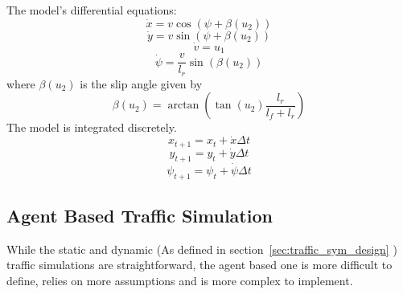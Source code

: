 \documentclass{article}
\begin{document}
\smallskip
The model's differential equations:
\begin{equation}\dot{x} = v \cos(\psi + \beta (u_2)) \end{equation}
\begin{equation}\dot{y} = v \sin(\psi + \beta (u_2)) \end{equation}
\begin{equation}\dot{v} = u_1 \end{equation}
\begin{equation}\dot{\psi} = \frac{v} {l_r} \sin(\beta(u_2)) \end{equation}
\medskip
where \( \beta(u_2) \) is the slip angle given by
\begin{equation} \beta(u_2) = \arctan (\tan(u_2) \frac{l_r} { l_f + l_r })  \end{equation}
\bigskip
The model is integrated discretely.
\begin{equation} x_{t+1} = x_t + \dot{x}\Delta t \end{equation}
\begin{equation} y_{t+1} = y_t + \dot{y}\Delta t \end{equation}
\begin{equation} {\psi}_{t+1} = {\psi}_t + \dot{\psi}\Delta t\end{equation}

\clearpage

\subsection{Agent Based Traffic Simulation}
While the static and dynamic (As defined in section~\ref{sec:traffic_sym_design} ) traffic simulations are straightforward, the agent based one is more difficult to define, relies on more assumptions and is more complex to implement.
\end{document}
